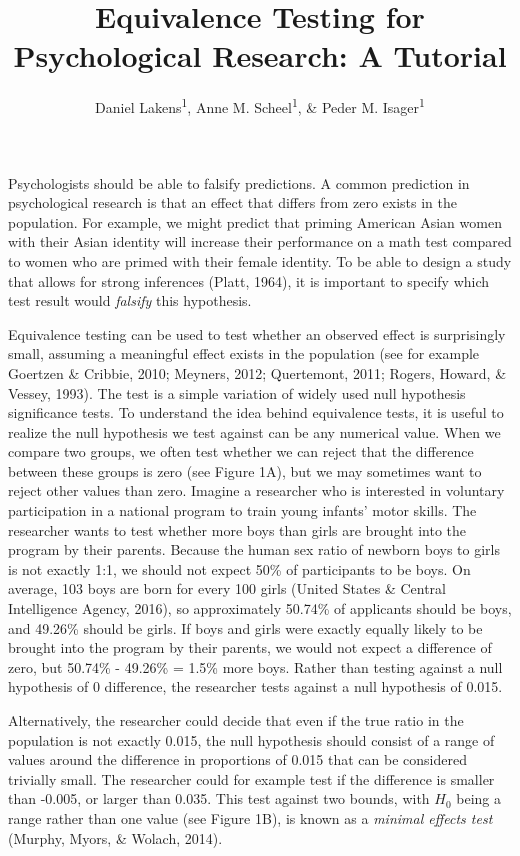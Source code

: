 \documentclass[english,floatsintext,man]{apa6}
\title{Equivalence Testing for Psychological Research: A Tutorial}
\author{Daniel Lakens\textsuperscript{1}, Anne M. Scheel\textsuperscript{1}, \& Peder M. Isager\textsuperscript{1}}
\affiliation{
    \vspace{0.5cm}
          \textsuperscript{1} Eindhoven University of Technology  }
\theoremstyle{definition}
\theoremstyle{definition}
\theoremstyle{definition}
\theoremstyle{remark}
\begin{document}
\maketitle

\setcounter{secnumdepth}{0}



Psychologists should be able to falsify predictions. A common prediction
in psychological research is that an effect that differs from zero
exists in the population. For example, we might predict that priming
American Asian women with their Asian identity will increase their
performance on a math test compared to women who are primed with their
female identity. To be able to design a study that allows for strong
inferences (Platt, 1964), it is important to specify which test result
would \emph{falsify} this hypothesis.

Equivalence testing can be used to test whether an observed effect is
surprisingly small, assuming a meaningful effect exists in the
population (see for example Goertzen \& Cribbie, 2010; Meyners, 2012;
Quertemont, 2011; Rogers, Howard, \& Vessey, 1993). The test is a simple
variation of widely used null hypothesis significance tests. To
understand the idea behind equivalence tests, it is useful to realize
the null hypothesis we test against can be any numerical value. When we
compare two groups, we often test whether we can reject that the
difference between these groups is zero (see Figure 1A), but we may
sometimes want to reject other values than zero. Imagine a researcher
who is interested in voluntary participation in a national program to
train young infants' motor skills. The researcher wants to test whether
more boys than girls are brought into the program by their parents.
Because the human sex ratio of newborn boys to girls is not exactly 1:1,
we should not expect 50\% of participants to be boys. On average, 103
boys are born for every 100 girls (United States \& Central Intelligence
Agency, 2016), so approximately 50.74\% of applicants should be boys,
and 49.26\% should be girls. If boys and girls were exactly equally
likely to be brought into the program by their parents, we would not
expect a difference of zero, but 50.74\% - 49.26\% = 1.5\% more boys.
Rather than testing against a null hypothesis of 0 difference, the
researcher tests against a null hypothesis of 0.015.

Alternatively, the researcher could decide that even if the true ratio
in the population is not exactly 0.015, the null hypothesis should
consist of a range of values around the difference in proportions of
0.015 that can be considered trivially small. The researcher could for
example test if the difference is smaller than -0.005, or larger than
0.035. This test against two bounds, with \(H_0\) being a range rather
than one value (see Figure 1B), is known as a \emph{minimal effects
test} (Murphy, Myors, \& Wolach, 2014).
\end{document}
